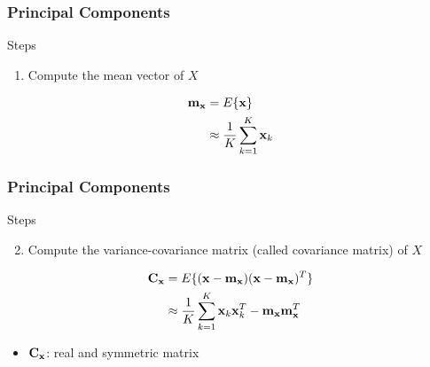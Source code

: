 \documentclass[english,11pt,table,handout]{beamer}
\begin{document}
\frame
{
	\frametitle{Principal Components}
	\large
	\begin{block}{Steps}
		\begin{enumerate}
			\setcounter{enumi}{0}
			\item Compute the mean vector of $X$
		\end{enumerate}
		\begin{equation}
			\nonumber
			\begin{split}
				\text{\textbf{m}}_\text{\textbf{x}} 
					&= E\{\text{\textbf{x}}\}\\
					&\approx \frac{1}{K} \sum_{k=1}^{K}{\text{\textbf{x}}_k}
			\end{split}
		\end{equation}
	\end{block}
}
\frame
{
	\frametitle{Principal Components}
	\large
	\begin{block}{Steps}
		\begin{enumerate}
			\setcounter{enumi}{1}
			\item Compute the variance-covariance matrix (called covariance matrix) of $X$
		\end{enumerate}
		\begin{equation}
		\nonumber
		\begin{split}
		\text{\textbf{C}}_\text{\textbf{x}} 
		&= E\{ (\text{\textbf{x}} - \text{\textbf{m}}_\text{\textbf{x}})(\text{\textbf{x}} - \text{\textbf{m}}_\text{\textbf{x}})^T \}\\
		&\approx \frac{1}{K} \sum_{k=1}^{K}{ \text{\textbf{x}}_k \text{\textbf{x}}_k^T } - \text{\textbf{m}}_\text{\textbf{x}} \text{\textbf{m}}_\text{\textbf{x}}^T
		\end{split}
		\end{equation}
		
		\begin{itemize}
			\item $\text{\textbf{C}}_\text{\textbf{x}}$: real and symmetric matrix
		\end{itemize}
	\end{block}
}
\end{document}
